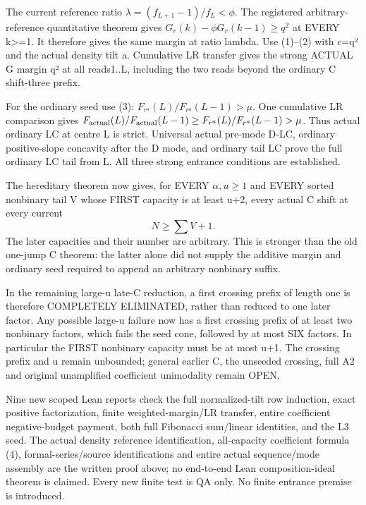 The current reference ratio
$\lambda=(f_{L+1}-1)/f_L<\phi$.
The registered arbitrary-reference quantitative theorem gives
$G_r(k)-\phi G_r(k-1)\ge q^2$ at EVERY k>=1.
It therefore gives the same margin at ratio lambda.
Use (1)--(2) with c=q² and the actual density tilt a.
Cumulative LR transfer gives the strong ACTUAL G margin q²
at all reads1..L, including the two reads beyond the ordinary
C shift-three prefix.

For the ordinary seed use (3): $F_{r^a}(L)/F_{r^a}(L-1)>\mu$.
One cumulative LR comparison gives
$F_{\rm actual}(L)/F_{\rm actual}(L-1)\ge
F_{r^a}(L)/F_{r^a}(L-1)>\mu$.
Thus actual ordinary LC at centre L is strict.
Universal actual pre-mode D-LC, ordinary positive-slope concavity
after the D mode, and ordinary tail LC prove the full ordinary
LC tail from L. All three strong entrance conditions are established.

The hereditary theorem now gives, for EVERY $\alpha,u\ge1$ and EVERY
sorted nonbinary tail V whose FIRST capacity is at least u+2,
every actual C shift at every current
\[
                              N\ge\sum V+1.
\]
The later capacities and their number are arbitrary.
This is stronger than the old one-jump C theorem: the latter alone
did not supply the additive margin and ordinary seed required to
append an arbitrary nonbinary suffix.

In the remaining large-u late-C reduction, a first crossing prefix
of length one is therefore COMPLETELY ELIMINATED, rather than reduced
to one later factor. Any possible large-u failure now has a first
crossing prefix of at least two nonbinary factors, which fails the
seed cone, followed by at most SIX factors. In particular the FIRST
nonbinary capacity must be at most u+1. The crossing prefix and u
remain unbounded; general earlier C, the unseeded crossing, full A2
and original unamplified coefficient unimodality remain OPEN.

Nine new scoped Lean reports check the full normalized-tilt row
induction, exact positive factorization, finite weighted-margin/LR
transfer, entire coefficient negative-budget payment, both full
Fibonacci sum/linear identities, and the L3 seed.
The actual density reference identification, all-capacity coefficient
formula (4), formal-series/source identifications and entire actual
sequence/mode assembly are the written proof above; no end-to-end
Lean composition-ideal theorem is claimed. Every new finite test is
QA only. No finite entrance premise is introduced.

